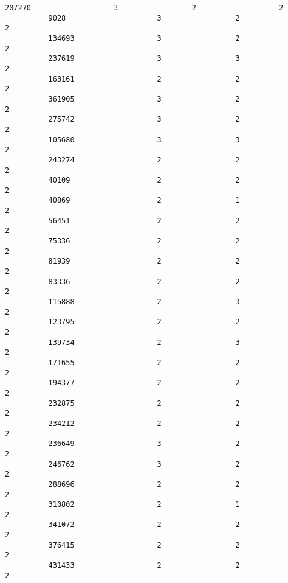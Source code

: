 \documentclass[11pt]{article}
\begin{document}
\begin{Verbatim}[commandchars=\\\{\}]
          207270                   3                 2                   2   
          9028                     3                 2                   2   
          134693                   3                 2                   2   
          237619                   3                 3                   2   
          163161                   2                 2                   2   
          361905                   3                 2                   2   
          275742                   3                 2                   2   
          105680                   3                 3                   2   
          243274                   2                 2                   2   
          40109                    2                 2                   2   
          40869                    2                 1                   2   
          56451                    2                 2                   2   
          75336                    2                 2                   2   
          81939                    2                 2                   2   
          83336                    2                 2                   2   
          115888                   2                 3                   2   
          123795                   2                 2                   2   
          139734                   2                 3                   2   
          171655                   2                 2                   2   
          194377                   2                 2                   2   
          232875                   2                 2                   2   
          234212                   2                 2                   2   
          236649                   3                 2                   2   
          246762                   3                 2                   2   
          288696                   2                 2                   2   
          310802                   2                 1                   2   
          341072                   2                 2                   2   
          376415                   2                 2                   2   
          431433                   2                 2                   2   
          

\end{Verbatim}
\end{document}
